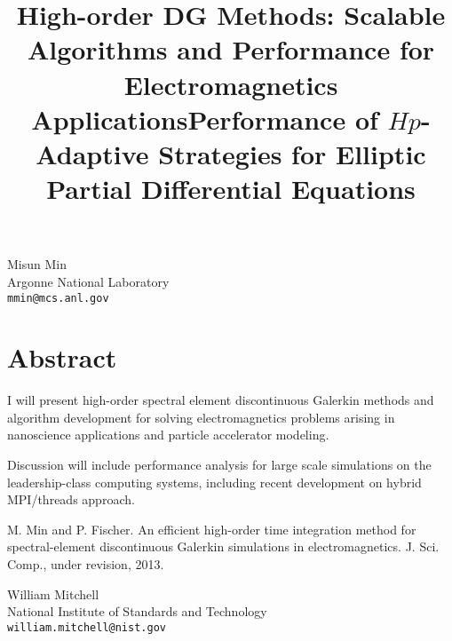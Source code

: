 \documentclass[article,A4,11pt]{llncs}%
\begin{document}
\title{High-order DG Methods: Scalable Algorithms and Performance for Electromagnetics Applications}
 \author{} \institute{}
\maketitle
\begin{center}
{\large Misun Min}\\
Argonne National Laboratory\\
{\tt mmin@mcs.anl.gov}
\end{center}

\section*{Abstract}
I will present high-order spectral element discontinuous Galerkin methods and algorithm development for solving electromagnetics problems arising in nanoscience applications and particle accelerator modeling. 

Discussion will include performance analysis for large scale simulations on the leadership-class computing systems, including recent development on hybrid MPI/threads approach. 




\begin{thebibliography}{10}
{\sc M. Min and P. Fischer}. {An efficient high-order time integration method for spectral-element discontinuous Galerkin simulations in electromagnetics}. J. Sci. Comp., under revision, 2013.
\end{thebibliography}

\title{Performance of $Hp$-Adaptive Strategies for Elliptic Partial Differential Equations}
 \author{} \institute{}
\maketitle
\begin{center}
{\large William Mitchell}\\
National Institute of Standards and Technology\\
{\tt william.mitchell@nist.gov}
\end{center}
\end{document}
